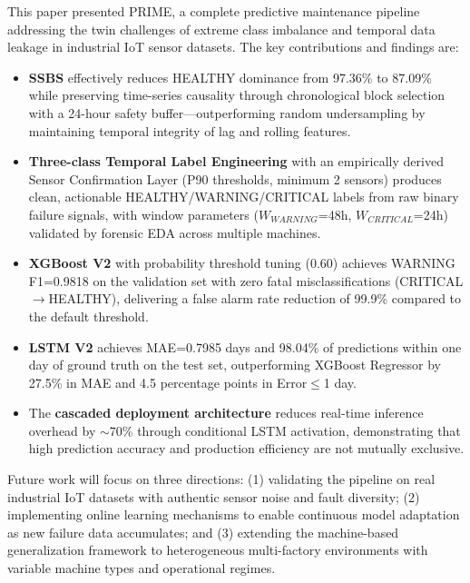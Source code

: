 \documentclass[conference]{IEEEtran}
\begin{document}
This paper presented PRIME, a complete predictive maintenance pipeline addressing the twin challenges of extreme class imbalance and temporal data leakage in industrial IoT sensor datasets. The key contributions and findings are:

\begin{itemize}
\item \textbf{SSBS} effectively reduces HEALTHY dominance from 97.36\% to 87.09\% while preserving time-series causality through chronological block selection with a 24-hour safety buffer—outperforming random undersampling by maintaining temporal integrity of lag and rolling features.

\item \textbf{Three-class Temporal Label Engineering} with an empirically derived Sensor Confirmation Layer (P90 thresholds, minimum 2 sensors) produces clean, actionable HEALTHY/WARNING/CRITICAL labels from raw binary failure signals, with window parameters ($W_{WARNING}$=48h, $W_{CRITICAL}$=24h) validated by forensic EDA across multiple machines.

\item \textbf{XGBoost V2} with probability threshold tuning (0.60) achieves WARNING F1=0.9818 on the validation set with zero fatal misclassifications (CRITICAL$\rightarrow$HEALTHY), delivering a false alarm rate reduction of 99.9\% compared to the default threshold.

\item \textbf{LSTM V2} achieves MAE=0.7985 days and 98.04\% of predictions within one day of ground truth on the test set, outperforming XGBoost Regressor by 27.5\% in MAE and 4.5 percentage points in Error$\leq$1 day.

\item The \textbf{cascaded deployment architecture} reduces real-time inference overhead by $\sim$70\% through conditional LSTM activation, demonstrating that high prediction accuracy and production efficiency are not mutually exclusive.
\end{itemize}

Future work will focus on three directions: (1) validating the pipeline on real industrial IoT datasets with authentic sensor noise and fault diversity; (2) implementing online learning mechanisms to enable continuous model adaptation as new failure data accumulates; and (3) extending the machine-based generalization framework to heterogeneous multi-factory environments with variable machine types and operational regimes.
\end{document}
